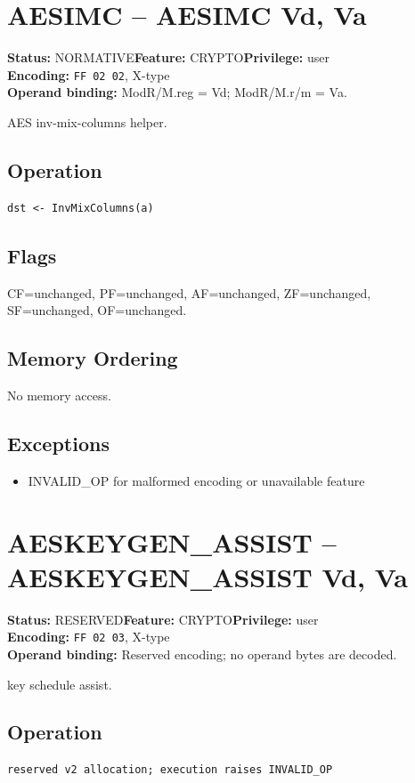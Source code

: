 \documentclass[10pt]{article}
\begin{document}
\section{AESIMC -- AESIMC Vd, Va}
\textbf{Status:} NORMATIVE\quad \textbf{Feature:} CRYPTO\quad \textbf{Privilege:} user\\
\textbf{Encoding:} \texttt{FF 02 02}, X-type\\
\textbf{Operand binding:} ModR/M.reg = Vd; ModR/M.r/m = Va.

AES inv-mix-columns helper.

\subsection*{Operation}
\begin{lstlisting}
dst <- InvMixColumns(a)
\end{lstlisting}
\subsection*{Flags}
CF=unchanged, PF=unchanged, AF=unchanged, ZF=unchanged, SF=unchanged, OF=unchanged.
\subsection*{Memory Ordering}
No memory access.
\subsection*{Exceptions}
\begin{itemize}
\item INVALID\_OP for malformed encoding or unavailable feature
\end{itemize}
\clearpage

\section{AESKEYGEN\_ASSIST -- AESKEYGEN\_ASSIST Vd, Va}
\textbf{Status:} RESERVED\quad \textbf{Feature:} CRYPTO\quad \textbf{Privilege:} user\\
\textbf{Encoding:} \texttt{FF 02 03}, X-type\\
\textbf{Operand binding:} Reserved encoding; no operand bytes are decoded.

key schedule assist.

\subsection*{Operation}
\begin{lstlisting}
reserved v2 allocation; execution raises INVALID_OP
\end{lstlisting}
\end{document}
